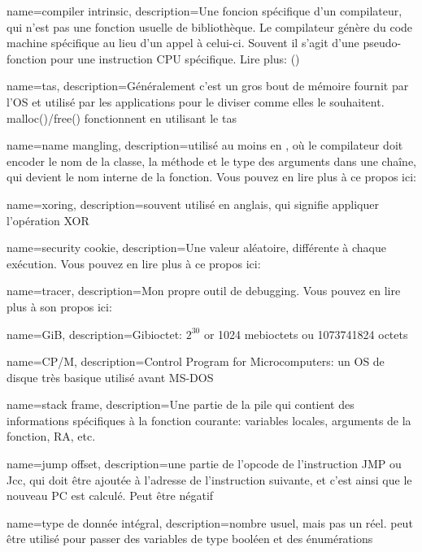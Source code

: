 {
  name=compiler intrinsic,
  description={Une foncion spécifique d'un compilateur, qui n'est pas une fonction usuelle de bibliothèque.
    Le compilateur génère du code machine spécifique au lieu d'un appel à celui-ci.
    Souvent il s'agit d'une pseudo-fonction pour une instruction \ac{CPU} spécifique. Lire plus:
    ()}
}

{
  name={tas},
  description={Généralement c'est un gros bout de mémoire fournit par l'\ac{OS} et utilisé par
  les applications pour le diviser comme elles le souhaitent. malloc()/free() fonctionnent en utilisant le tas}
}

{
  name=name mangling,
  description={utilisé au moins en \Cpp, où le compilateur doit encoder le nom de la classe, la méthode et le type des arguments dans une chaîne,
  qui devient le nom interne de la fonction. Vous pouvez en lire plus à ce propos ici: }
}

{
  name=xoring,
  description={souvent utilisé en anglais, qui signifie appliquer l'opération \ac{XOR}}
}

{
  name=security cookie,
  description={Une valeur aléatoire, différente à chaque exécution. Vous pouvez en lire plus à ce propos ici: }
}

{
  name=tracer,
  description={Mon propre outil de debugging. Vous pouvez en lire plus à son propos ici: }
}

{
  name=GiB,
  description={Gibioctet: $2^{30}$ or 1024 mebioctets ou 1073741824 octets}
}

{
  name=CP/M,
  description={Control Program for Microcomputers:
  un \ac{OS} de disque très basique utilisé avant MS-DOS}
}

{
  name=stack frame,
  description={Une partie de la pile qui contient des informations spécifiques à la fonction courante:
  variables locales, arguments de la fonction, \ac{RA}, etc.}
}

{
  name=jump offset,
  description={une partie de l'opcode de l'instruction JMP ou Jcc, qui doit être ajoutée à l'adresse de l'instruction suivante,
  et c'est ainsi que le nouveau \ac{PC} est calculé. Peut être négatif}
}

{
  name={type de donnée intégral},
  description={nombre usuel, mais pas un réel. peut être utilisé pour passer des variables de type booléen et des énumérations}
}


